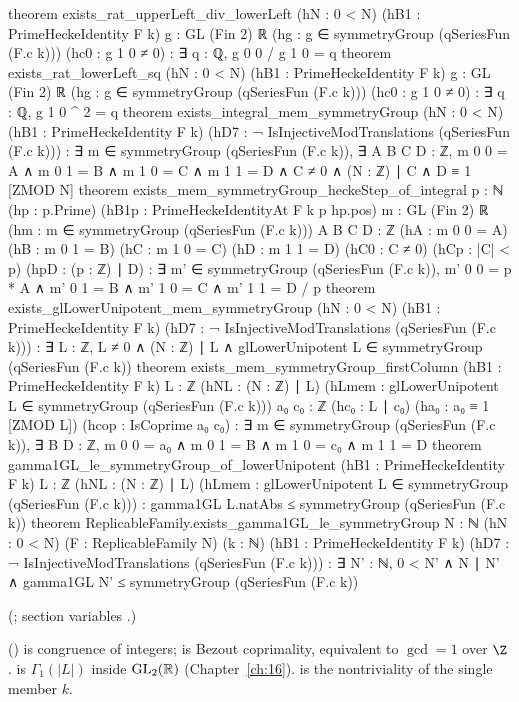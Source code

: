 \begin{leancode}
theorem exists_rat_upperLeft_div_lowerLeft (hN : 0 < N) (hB1 : PrimeHeckeIdentity F k)
    {g : GL (Fin 2) ℝ} (hg : g ∈ symmetryGroup (qSeriesFun (F.c k))) (hc0 : g 1 0 ≠ 0) :
    ∃ q : ℚ, g 0 0 / g 1 0 = q
theorem exists_rat_lowerLeft_sq (hN : 0 < N) (hB1 : PrimeHeckeIdentity F k)
    {g : GL (Fin 2) ℝ} (hg : g ∈ symmetryGroup (qSeriesFun (F.c k))) (hc0 : g 1 0 ≠ 0) :
    ∃ q : ℚ, g 1 0 ^ 2 = q
theorem exists_integral_mem_symmetryGroup (hN : 0 < N) (hB1 : PrimeHeckeIdentity F k)
    (hD7 : ¬ IsInjectiveModTranslations (qSeriesFun (F.c k))) :
    ∃ m ∈ symmetryGroup (qSeriesFun (F.c k)), ∃ A B C D : ℤ, m 0 0 = A ∧ m 0 1 = B ∧
      m 1 0 = C ∧ m 1 1 = D ∧ C ≠ 0 ∧ (N : ℤ) ∣ C ∧ D ≡ 1 [ZMOD N]
theorem exists_mem_symmetryGroup_heckeStep_of_integral {p : ℕ} (hp : p.Prime)
    (hB1p : PrimeHeckeIdentityAt F k p hp.pos) {m : GL (Fin 2) ℝ}
    (hm : m ∈ symmetryGroup (qSeriesFun (F.c k))) {A B C D : ℤ} (hA : m 0 0 = A)
    (hB : m 0 1 = B) (hC : m 1 0 = C) (hD : m 1 1 = D) (hC0 : C ≠ 0) (hCp : |C| < p)
    (hpD : (p : ℤ) ∣ D) :
    ∃ m' ∈ symmetryGroup (qSeriesFun (F.c k)), m' 0 0 = p * A ∧ m' 0 1 = B ∧ m' 1 0 = C ∧
      m' 1 1 = D / p
theorem exists_glLowerUnipotent_mem_symmetryGroup (hN : 0 < N) (hB1 : PrimeHeckeIdentity F k)
    (hD7 : ¬ IsInjectiveModTranslations (qSeriesFun (F.c k))) :
    ∃ L : ℤ, L ≠ 0 ∧ (N : ℤ) ∣ L ∧ glLowerUnipotent L ∈ symmetryGroup (qSeriesFun (F.c k))
theorem exists_mem_symmetryGroup_firstColumn (hB1 : PrimeHeckeIdentity F k)
    {L : ℤ} (hNL : (N : ℤ) ∣ L)
    (hLmem : glLowerUnipotent L ∈ symmetryGroup (qSeriesFun (F.c k))) {a₀ c₀ : ℤ}
    (hc₀ : L ∣ c₀) (ha₀ : a₀ ≡ 1 [ZMOD L]) (hcop : IsCoprime a₀ c₀) :
    ∃ m ∈ symmetryGroup (qSeriesFun (F.c k)), ∃ B D : ℤ, m 0 0 = a₀ ∧ m 0 1 = B ∧
      m 1 0 = c₀ ∧ m 1 1 = D
theorem gamma1GL_le_symmetryGroup_of_lowerUnipotent (hB1 : PrimeHeckeIdentity F k)
    {L : ℤ} (hNL : (N : ℤ) ∣ L)
    (hLmem : glLowerUnipotent L ∈ symmetryGroup (qSeriesFun (F.c k))) :
    gamma1GL L.natAbs ≤ symmetryGroup (qSeriesFun (F.c k))
theorem ReplicableFamily.exists_gamma1GL_le_symmetryGroup {N : ℕ} (hN : 0 < N)
    (F : ReplicableFamily N) (k : ℕ) (hB1 : PrimeHeckeIdentity F k)
    (hD7 : ¬ IsInjectiveModTranslations (qSeriesFun (F.c k))) :
    ∃ N' : ℕ, 0 < N' ∧ N ∣ N' ∧ gamma1GL N' ≤ symmetryGroup (qSeriesFun (F.c k))
\end{leancode}
(; section variables .)
\begin{dictionary}
 () is congruence of integers;  is Bezout coprimality, equivalent to
$\gcd=1$ over $\Z$.   is $\Gamma_1(|L|)$ inside $\mathrm{GL}_2(\mathbb{R})$ (Chapter~\ref{ch:16}).   is the
nontriviality of the single member $k$.
\end{dictionary}
